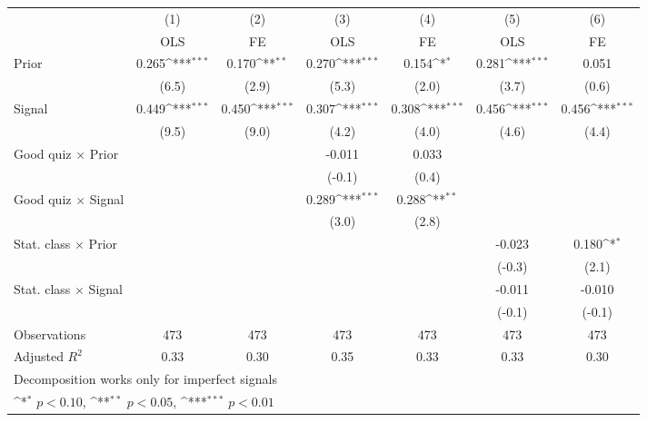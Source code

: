 {
\def\sym#1{\ifmmode^{#1}\else\(^{#1}\)\fi}
\begin{tabular}{l*{6}{c}}
\hline\hline
                &\multicolumn{1}{c}{(1)}&\multicolumn{1}{c}{(2)}&\multicolumn{1}{c}{(3)}&\multicolumn{1}{c}{(4)}&\multicolumn{1}{c}{(5)}&\multicolumn{1}{c}{(6)}\\
                &\multicolumn{1}{c}{OLS}&\multicolumn{1}{c}{FE}&\multicolumn{1}{c}{OLS}&\multicolumn{1}{c}{FE}&\multicolumn{1}{c}{OLS}&\multicolumn{1}{c}{FE}\\
\hline
Prior           &    0.265\sym{***}&    0.170\sym{**} &    0.270\sym{***}&    0.154\sym{*}  &    0.281\sym{***}&    0.051         \\
                &    (6.5)         &    (2.9)         &    (5.3)         &    (2.0)         &    (3.7)         &    (0.6)         \\
Signal          &    0.449\sym{***}&    0.450\sym{***}&    0.307\sym{***}&    0.308\sym{***}&    0.456\sym{***}&    0.456\sym{***}\\
                &    (9.5)         &    (9.0)         &    (4.2)         &    (4.0)         &    (4.6)         &    (4.4)         \\
Good quiz $\times$ Prior&                  &                  &   -0.011         &    0.033         &                  &                  \\
                &                  &                  &   (-0.1)         &    (0.4)         &                  &                  \\
Good quiz $\times$ Signal&                  &                  &    0.289\sym{***}&    0.288\sym{**} &                  &                  \\
                &                  &                  &    (3.0)         &    (2.8)         &                  &                  \\
Stat. class $\times$ Prior&                  &                  &                  &                  &   -0.023         &    0.180\sym{*}  \\
                &                  &                  &                  &                  &   (-0.3)         &    (2.1)         \\
Stat. class $\times$ Signal&                  &                  &                  &                  &   -0.011         &   -0.010         \\
                &                  &                  &                  &                  &   (-0.1)         &   (-0.1)         \\
\hline
Observations    &      473         &      473         &      473         &      473         &      473         &      473         \\
Adjusted \(R^{2}\)&     0.33         &     0.30         &     0.35         &     0.33         &     0.33         &     0.30         \\
\hline\hline
\multicolumn{7}{l}{\footnotesize Decomposition works only for imperfect signals}\\
\multicolumn{7}{l}{\footnotesize \sym{*} \(p<0.10\), \sym{**} \(p<0.05\), \sym{***} \(p<0.01\)}\\
\end{tabular}
}
